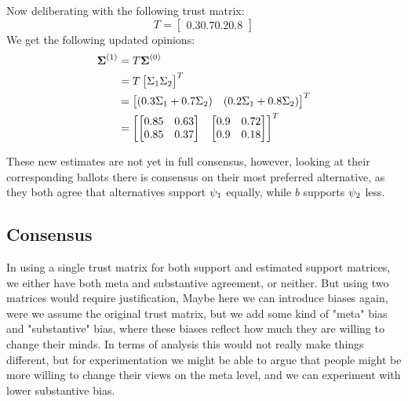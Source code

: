 \begin{example}
	Now deliberating with the following trust matrix:
	\[
		T=\begin{bmatrix}
			0.3	0.7
			0.2	0.8
		\end{bmatrix}
	\]
	We get the following updated opinions:
	\begin{align*}
		\boldsymbol{\boldsymbol{\Sigma}}^{(1)} & = T\boldsymbol{\boldsymbol{\Sigma}}^{(0)}                                                                     \\
		                                            & =T\begin{bmatrix}\Sigma_1 \Sigma_2\end{bmatrix}^{T}                                                      \\
		                                            & =\begin{bmatrix}(0.3\Sigma_1 + 0.7\Sigma_{2}) & (0.2\Sigma_1 + 0.8\Sigma_{2})\end{bmatrix}^{T} \\
		                                            & = \begin{bmatrix}
			                                                \begin{bmatrix}
				0.85 & 0.63 \\
				0.85 & 0.37 \\
			\end{bmatrix} &
			                                                \begin{bmatrix}
				0.9 & 0.72 \\
				0.9 & 0.18 \\
			\end{bmatrix}
		                                                \end{bmatrix}^{T}
	\end{align*}

	These new estimates are not yet in full consensus, however, looking at their corresponding ballots there is consensus on their most preferred alternative, as they both agree that alternatives support $\psi_1$ equally, while $b$ supports $\psi_2$ less.

	\label{example:deGroot-delib}
\end{example}

\subsection{Consensus}
\label{sub: concensus DeGroot}
\textcolor{RedViolet}{In using a single trust matrix for both support and estimated support matrices, we either have both meta and substantive agreement, or neither. But using two matrices would require justification, Maybe here we can introduce biases again, were we assume the original trust matrix, but we add some kind of "meta" bias and "substantive" bias, where these biases reflect how much they are willing to change their minds. In terms of analysis this would not really make things different, but for experimentation we might be able to argue that people might be more willing to change their views on the meta level, and we can experiment with lower substantive bias.}

